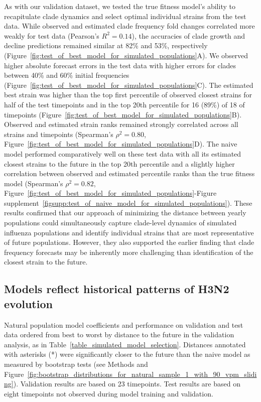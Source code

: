 As with our validation dataset, we tested the true fitness model's ability to recapitulate clade dynamics and select optimal individual strains from the test data.
While observed and estimated clade frequency fold changes correlated more weakly for test data (Pearson's $R^2 = 0.14$), the accuracies of clade growth and decline predictions remained similar at 82\% and 53\%, respectively (Figure~\ref{fig:test_of_best_model_for_simulated_populations}A).
We observed higher absolute forecast errors in the test data with higher errors for clades between 40\% and 60\% initial frequencies (Figure~\ref{fig:test_of_best_model_for_simulated_populations}C).
The estimated best strain was higher than the top first percentile of observed closest strains for half of the test timepoints and in the top 20th percentile for 16 (89\%) of 18 of timepoints (Figure~\ref{fig:test_of_best_model_for_simulated_populations}B).
Observed and estimated strain ranks remained strongly correlated across all strains and timepoints (Spearman's $\rho^2 = 0.80$, Figure~\ref{fig:test_of_best_model_for_simulated_populations}D).
The naive model performed comparatively well on these test data with all its estimated closest strains to the future in the top 20th percentile and a slightly higher correlation between observed and estimated percentile ranks than the true fitness model (Spearman's $\rho^2 = 0.82$, Figure~\ref{fig:test_of_best_model_for_simulated_populations}-Figure supplement~\ref{figsupp:test_of_naive_model_for_simulated_populations}).
These results confirmed that our approach of minimizing the distance between yearly populations could simultaneously capture clade-level dynamics of simulated influenza populations and identify individual strains that are most representative of future populations.
However, they also supported the earlier finding that clade frequency forecasts may be inherently more challenging than identification of the closest strain to the future.

\subsection*{Models reflect historical patterns of H3N2 evolution}

\begin{table}[htb]
  \begin{center}
    \scalebox{0.9}{
      
    }
    \caption{
      Natural population model coefficients and performance on validation and test data ordered from best to worst by distance to the future in the validation analysis, as in Table~\ref{table_simulated_model_selection}.
      Distances annotated with asterisks (*) were significantly closer to the future than the naive model as measured by bootstrap tests (see Methods and Figure~\ref{fig:bootstrap_distributions_for_natural_sample_1_with_90_vpm_sliding}).
      Validation results are based on 23 timepoints.
      Test results are based on eight timepoints not observed during model training and validation.
    }
    \label{table_natural_model_selection}
  \end{center}
\end{table}

